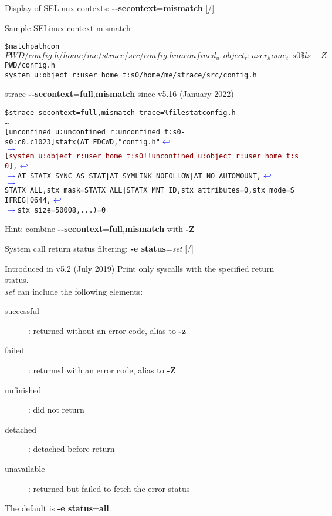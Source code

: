 \documentclass[unicode,aspectratio=169,xcolor={table,dvipsnames,usernames}]{beamer}
\newcommand{\symlinebreak}{\textcolor{blue}{\(\hookleftarrow\)}}
\newcommand{\symlinecont}{\textcolor{blue}{\(\longrightarrow\)}}
\begin{document}
\begin{frame}[fragile]{Display of SELinux contexts: \textbf{-{}-secontext}=\textbf{mismatch} \hfill [\insertframenumber/\inserttotalframenumber]}
\large
\begin{block}{Sample SELinux context mismatch}
\scriptsize
\begin{alltt}
\$ matchpathcon $PWD/config.h
/home/me/strace/src/config.h	unconfined_u:object_r:user_home_t:s0
\$ ls -Z $PWD/config.h
system_u:object_r:user_home_t:s0 /home/me/strace/src/config.h
\end{alltt}
\end{block}
\large
\begin{block}{strace \textbf{-{}-secontext}=\textbf{full},\textbf{mismatch} \hfill since v5.16 (January 2022)}
\scriptsize
\begin{alltt}
\$ strace --secontext=full,mismatch --trace=\%file stat config.h
\ldots
[unconfined_u:unconfined_r:unconfined_t:s0-s0:c0.c1023] statx(AT_FDCWD, "config.h" \symlinebreak
\symlinecont [\textcolor{darkred}{system_u:object_r:user_home_t:s0!!unconfined_u:object_r:user_home_t:s0}], \symlinebreak
\symlinecont AT_STATX_SYNC_AS_STAT|AT_SYMLINK_NOFOLLOW|AT_NO_AUTOMOUNT, \symlinebreak
\symlinecont STATX_ALL, {stx_mask=STATX_ALL|STATX_MNT_ID, stx_attributes=0, stx_mode=S_IFREG|0644, \symlinebreak
\symlinecont stx_size=50008, ...}) = 0
\end{alltt}
\end{block}
\large
Hint: combine \textbf{-{}-secontext}=\textbf{full},\textbf{mismatch} with \textbf{-Z}
\end{frame}

\begin{frame}{System call return status filtering: \textbf{-e status}=\textit{set} \hfill [\insertframenumber/\inserttotalframenumber]}
\Large
\begin{block}{Introduced in v5.2 (July 2019)}
\large
Print only syscalls with the specified return status. \\
\textit{set} can include the following elements:
\begin{description}
	\item[successful]: returned without an error code, alias to \textbf{-z}
	\item[failed]: returned with an error code, alias to \textbf{-Z}
	\item[unfinished]: did not return
	\item[detached]: detached before return
	\item[unavailable]: returned but failed to fetch the error status
\end{description}
\end{block}
The default is \textbf{-e status}=\textbf{all}.
\end{frame}
\end{document}
